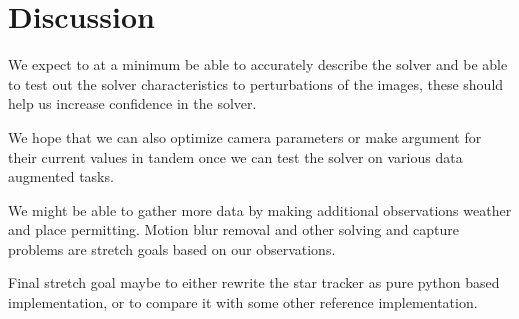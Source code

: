 \documentclass[]{article}
\begin{document}
	\section{Discussion}
	
	We expect to at a minimum be able to accurately describe the solver and be able to test out the solver characteristics to perturbations of the images, these should help us increase confidence in the solver.
	
	We hope that we can also optimize camera parameters or make argument for their current values in tandem once we can test the solver on various data augmented tasks. 
	
	We might be able to gather more data by making additional observations weather and place permitting. Motion blur removal and other solving and capture problems are stretch goals based on our observations. 
	
	Final stretch goal maybe to either rewrite the star tracker as pure python based implementation,  or to compare it with some other reference implementation. 
	
	\printbibliography{}
	
\end{document}
